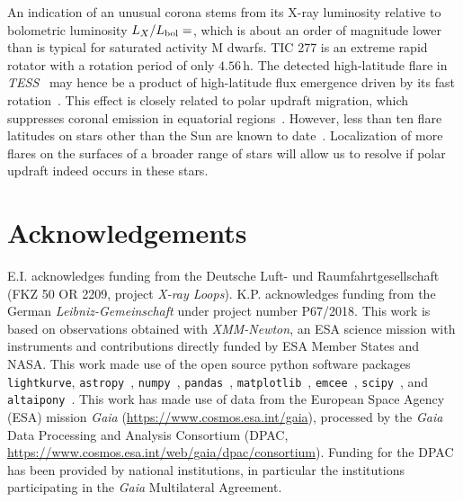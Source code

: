 \documentclass[twocolumn]{aastex631}
\begin{document}
An indication of an unusual corona stems from its X-ray luminosity relative to bolometric luminosity $L_X/L_{\rm bol}=$\LXLbol, which is about an order of magnitude lower than is typical for saturated activity M dwarfs. TIC 277 is an extreme rapid rotator with a rotation period of only $4.56\,$h. The detected high-latitude flare in \textit{TESS}~\citep{ilin2021giant} may hence be a product of high-latitude flux emergence driven by its fast rotation~\citep{weber2016modeling,weber2017suppression}. This effect is closely related to polar updraft migration, which suppresses coronal emission in equatorial regions~\citep{stepien2001rosat}. However, less than ten flare latitudes on stars other than the Sun are known to date~\citep{wolter2008doppler, ilin2021giant, johnson2021simultaneous}. Localization of more flares on the surfaces of a broader range of stars will allow us to resolve if polar updraft indeed occurs in these stars.



\section*{Acknowledgements}
 E.I. acknowledges funding from the Deutsche Luft- und Raumfahrtgesellschaft (FKZ 50 OR 2209, project \textit{X-ray Loops}). K.P. acknowledges funding from the German \textit{Leibniz-Gemeinschaft} under project number P67/2018. This work is based on observations obtained with \textit{XMM-Newton}, an ESA science mission with instruments and contributions directly funded by ESA Member States and NASA. This work made use of the open source python software packages \texttt{lightkurve}\citep{lightkurvecollaboration2018lightkurve}, \texttt{astropy}~\citep{robitaille2013astropy}, \texttt{numpy}~\citep{harris2020array}, \texttt{pandas}~\citep{reback2022pandasdev}, \texttt{matplotlib}~\citep{hunter2007matplotlib}, \texttt{emcee}~\citep{foreman-mackey2013emcee}, \texttt{scipy}~\citep{mckinney2010data}, and \texttt{altaipony}~\citep{ilin2021altaipony}. This work has made use of data from the European Space Agency (ESA) mission
{\it Gaia} (\url{https://www.cosmos.esa.int/gaia}), processed by the {\it Gaia}
Data Processing and Analysis Consortium (DPAC,
\url{https://www.cosmos.esa.int/web/gaia/dpac/consortium}). Funding for the DPAC
has been provided by national institutions, in particular the institutions
participating in the {\it Gaia} Multilateral Agreement.
\end{document}
